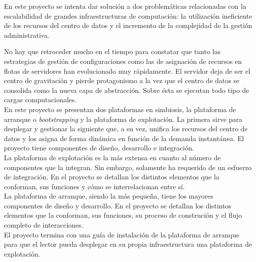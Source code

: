 \documentclass[a4paper,12pt,spanish,final]{epsc_tfc_pfc}
\begin{document}
\pagestyle{empty}
\portada{}


\begin{resum}{1cm}
En este proyecto se intenta dar solución a dos problemáticas relacionadas con la escalabilidad de grandes infraestructuras de computación: la utilización ineficiente de los recursos del centro de datos y el incremento de la complejidad de la gestión administrativa.

No hay que retroceder mucho en el tiempo para constatar que tanto las estrategias de gestión de configuraciones como las de asignación de recursos en flotas de servidores han evolucionado muy rápidamente. El servidor deja de ser el centro de gravitación y pierde protagonismo a la vez que el centro de datos se consolida como la nueva capa de abstracción. Sobre ésta se ejecutan todo tipo de cargas computacionales.\\

En este proyecto se presentan dos plataformas en simbiosis, la plataforma de arranque o \emph{bootstrapping} y la plataforma de explotación. La primera sirve para desplegar y gestionar la siguiente que, a su vez, unifica los recursos del centro de datos y los asigna de forma dinámica en función de la demanda instantánea. El proyecto tiene componentes de diseño, desarrollo e integración.\\

La plataforma de explotación es la más extensa en cuanto al número de componentes que la integran. Sin embargo, solamente ha requerido de un esfuerzo de integración. En el proyecto se detallan los distintos elementos que la conforman, sus funciones y cómo se interrelacionan entre sí.\\

La plataforma de arranque, siendo la más pequeña, tiene los mayores componentes de diseño y desarrollo. En el proyecto se detallan los distintos elementos que la conforman, sus funciones, su proceso de construción y el flujo completo de interacciones.\\

El proyecto termina con una guía de instalación de la plataforma de arranque para que el lector pueda desplegar en su propia infraestructura una plataforma de explotación.
\end{resum}

\end{document}
